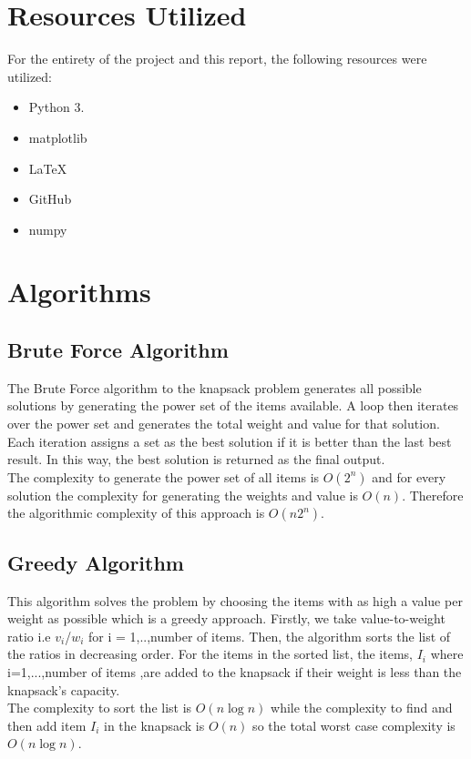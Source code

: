 \documentclass[a4paper, 11pt]{article}
\begin{document}

\section{Resources Utilized}
For the entirety of the project and this report, the following resources were utilized:
\begin{itemize}
    \item Python 3.
    \item matplotlib
    \item \LaTeX
    \item GitHub
    \item numpy
\end{itemize}

\section{Algorithms}



\subsection{Brute Force Algorithm}
The Brute Force algorithm to the knapsack problem generates all possible solutions by generating the power set of the items available. A loop then iterates over the power set and generates the total weight and value for that solution. Each iteration assigns a set as the best solution if it is better than the last best result. In this way, the best solution is returned as the final output. \\
The complexity to generate the power set of all items is $O(2^n)$ and for every solution the complexity for generating the weights and value is $O(n)$. Therefore the algorithmic complexity of this approach is $O(n2^n)$.


\subsection{Greedy Algorithm}
This algorithm solves the problem by choosing the items with as high a value per weight as possible which is a greedy approach. Firstly, we take value-to-weight ratio i.e $v_i$/$w_i$ for i = 1,..,number of items. Then, the algorithm sorts the list of the ratios in decreasing order. For the items in the sorted list, the items, $I_i$ where i=1,...,number of items ,are added to the knapsack if their weight is less than the knapsack's capacity. \\
The complexity to sort the list is $O(n \log n)$ while the complexity to find and then add item $I_i$ in the knapsack is $O(n)$ so the total worst case complexity is $O(n \log n)$.
\end{document}
